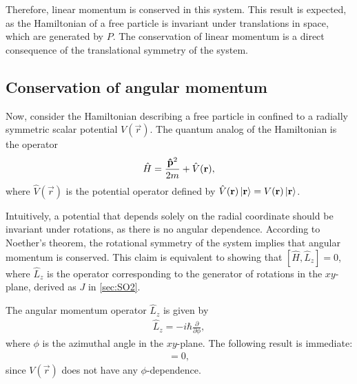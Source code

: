     Therefore, linear momentum is conserved in this system. This result is expected, as the Hamiltonian of a free particle is invariant under translations in space, which are generated by $P$. The conservation of linear momentum is a direct consequence of the translational symmetry of the system.

    \subsection{Conservation of angular momentum}
    Now, consider the Hamiltonian describing a free particle in confined to a radially symmetric scalar potential $V(\vec{r})$.
    The quantum analog of the Hamiltonian is the operator
    \begin{align*}
        \hat{H} = \frac{\mathbf{\hat{p}}^2}{2m}  + \hat{V}(\mathbf{r}),
    \end{align*}
    where $\hat{V}(\vec{r})$ is the potential operator defined by $\hat{V}(\mathbf{r})\ket{\mathbf{r}} = V(\mathbf{r})\ket{\mathbf{r}}$.

    Intuitively, a potential that depends solely on the radial coordinate should be invariant under rotations, as there is no angular dependence. According to Noether's theorem, the rotational symmetry of the system implies that angular momentum is conserved. This claim is equivalent to showing that $[\hat{H},\hat{L}_z] = 0$, where $\hat{L}_z$ is the operator corresponding to the generator of rotations in the $xy$-plane, derived as $J$ in \cref{sec:SO2}.

    The angular momentum operator $\hat{L}_z$ is given by
    \begin{align*}
        \hat{L}_z = -i\hbar \frac{\partial}{\partial\phi},
    \end{align*}
    where $\phi$ is the azimuthal angle in the $xy$-plane. The following result is immediate:
    \begin{align*}
        [V(\vec{r}),\hat{L}_z] = 0,
    \end{align*}
    since $V(\vec{r})$ does not have any $\phi$-dependence.
    
